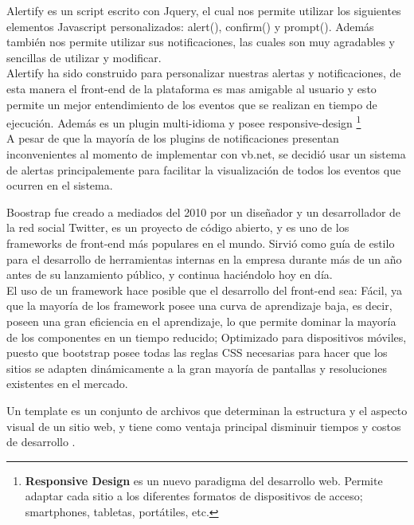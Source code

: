 
Alertify es un script escrito con Jquery, el cual nos permite utilizar los siguientes elementos Javascript personalizados: alert(), confirm() y prompt(). Además también nos permite utilizar sus notificaciones, las cuales son muy agradables y sencillas de utilizar y modificar\cite{ALE15}.
\\

Alertify ha sido construido para personalizar nuestras alertas y notificaciones, de esta manera el front-end de la plataforma es mas amigable al usuario y esto permite un mejor entendimiento de los eventos que se realizan en tiempo de ejecución. Además es un plugin multi-idioma y posee responsive-design \footnote{ \textbf{ Responsive Design} es un nuevo paradigma del desarrollo web. Permite adaptar cada sitio a los diferentes formatos de dispositivos de acceso; smartphones, tabletas, portátiles, etc.}
\\

A pesar de que la mayoría de los plugins de notificaciones presentan inconvenientes al momento de implementar con vb.net, se decidió usar un sistema de alertas principalemente para facilitar la visualización de todos los eventos que ocurren en el sistema.



Boostrap fue creado a mediados del 2010 por un diseñador y un desarrollador de la red social Twitter, es un proyecto de código abierto, y es uno de los frameworks de front-end más populares en el mundo. Sirvió como guía de estilo para el desarrollo de herramientas internas en la empresa durante más de un año antes de su lanzamiento público, y continua haciéndolo hoy en día\cite{boo15}.
\\

El uso de un framework hace posible que el desarrollo del front-end sea: Fácil, ya que la mayoría de los framework posee una curva de aprendizaje baja, es decir, poseen una gran eficiencia en el  aprendizaje, lo que permite dominar la mayoría de los componentes en un tiempo reducido; Optimizado para dispositivos móviles, puesto que bootstrap posee todas las reglas CSS necesarias para hacer que los sitios se  adapten dinámicamente a la gran mayoría de pantallas y resoluciones existentes en el mercado.



Un template es un conjunto de archivos que determinan la estructura y el aspecto visual de un sitio web, y tiene como ventaja principal disminuir tiempos y costos de desarrollo \cite{gli15}. 
\\

